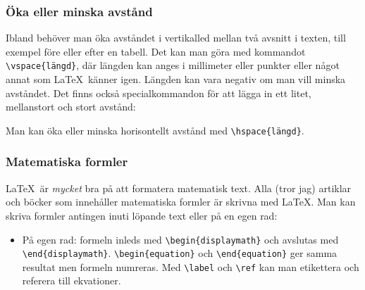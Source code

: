 
\begin{frame}[fragile=singleslide]
  \frametitle{Öka eller minska avstånd}
  Ibland behöver man öka avståndet i vertikalled mellan två avsnitt i texten, till exempel före eller efter en tabell. Det kan man göra med kommandot \verb/\vspace{längd}/, där längden kan anges i millimeter eller punkter eller något annat som \LaTeX\ känner igen. Längden kan vara negativ om man vill minska avståndet. Det finns också specialkommandon för att lägga in ett litet, mellanstort och stort avstånd:

  \begin{Code}
    \smallskip  \medskip  \bigskip
  \end{Code}

  Man kan öka eller minska horisontellt avstånd med \verb/\hspace{längd}/.
\end{frame}

\begin{frame}[fragile=singleslide]
  \frametitle{Matematiska formler}
  \LaTeX\ är \emph{mycket} bra på att formatera matematisk text.
  Alla (tror jag) artiklar och böcker som innehåller matematiska formler
  är skrivna med \LaTeX. Man kan skriva
  formler antingen inuti löpande text eller på en egen rad:
  \begin{itemize}
    \item<+-> På egen rad: formeln inleds med \verb+\begin{displaymath}+
          och avslutas med \verb+\end{displaymath}+.
          \verb+\begin{equation}+ och \verb+\end{equation}+ ger samma
          resultat men formeln numreras. Med \verb+\label+ och \verb+\ref+
          kan man etikettera och referera till ekvationer.
  \end{itemize}
\end{frame}


